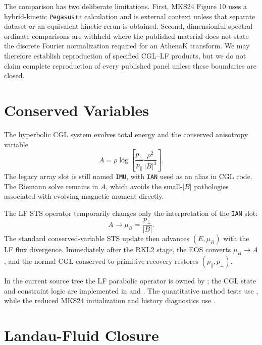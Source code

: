 \documentclass[11pt]{article}
\begin{document}
The comparison has two deliberate limitations.  First, MKS24 Figure 10 uses
a hybrid-kinetic \texttt{Pegasus++} calculation and is external context unless
that separate dataset or an equivalent kinetic rerun is obtained.  Second,
dimensionful spectral ordinate comparisons are withheld where the published
material does not state the discrete Fourier normalization required for an
AthenaK transform.  We may therefore establish reproduction of specified
CGL--LF products, but we do not claim complete reproduction of every published
panel unless these boundaries are closed.

\section{Conserved Variables}

The hyperbolic CGL system evolves total energy and the conserved anisotropy
variable
\begin{equation}
  A = \rho \log\left[
    \frac{p_\perp}{p_\parallel}
    \frac{\rho^2}{|B|^3}
  \right].
\end{equation}
The legacy array slot is still named \texttt{IMU}, with \texttt{IAN} used as an
alias in CGL code.  The Riemann solve remains in \(A\), which avoids the
small-\(|B|\) pathologies associated with evolving magnetic moment directly.

The LF STS operator temporarily changes only the interpretation of the
\texttt{IAN} slot:
\begin{equation}
  A \rightarrow \mu_B = \frac{p_\perp}{|B|}.
\end{equation}
The standard conserved-variable STS update then advances \((E,\mu_B)\) with the
LF flux divergence.  Immediately after the RKL2 stage, the EOS converts
\(\mu_B \rightarrow A\), and the normal CGL conserved-to-primitive recovery
restores \((p_\parallel,p_\perp)\).

In the current source tree the LF parabolic operator is owned by
; the CGL state and constraint
logic are implemented in  and
.  The quantitative method tests use
, while the reduced MKS24
initialization and history diagnostics use
.

\section{Landau-Fluid Closure}
\end{document}
